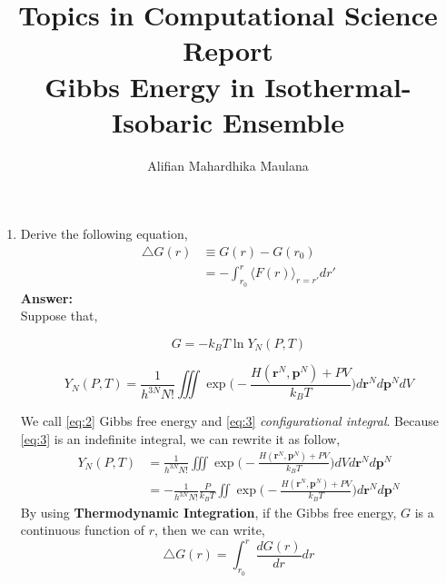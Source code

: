 \documentclass[a4paper,9pt]{article}
\title{Topics in Computational Science Report \\ Gibbs Energy in Isothermal-Isobaric Ensemble}
\author{Alifian Mahardhika Maulana}
\begin{document}
\maketitle
\begin{enumerate}
	\item Derive the following equation,
		\begin{equation}\label{eq:1}
		\begin{aligned}
		\triangle G(r) &\equiv G(r) - G(r_0)\\
		& = -\int_{r_0}^{r} \langle F(r) \rangle_{r=r'} dr'
		\end{aligned}
		\end{equation}
		\textbf{Answer:}\\
		\newline
		Suppose that,
		\begin{center}
			\begin{minipage}{0.29\linewidth}
				\begin{equation}\label{eq:2}
				G = -k_B T \ln Y_N(P,T)
				\end{equation}
			\end{minipage}
		\quad
			\begin{minipage}{0.67\linewidth}
				\begin{equation}\label{eq:3}
				Y_N(P,T) = \frac{1}{h^{3N}N!} \iiint\exp\Bigg(-\frac{H(\textbf{r}^N,\textbf{p}^N) + PV}{k_B T}\Bigg) d\textbf{r}^N d\textbf{p}^N dV
				\end{equation}
			\end{minipage}
		\end{center}
	We call \eqref{eq:2} Gibbs free energy and \eqref{eq:3} \textit{configurational integral}.
		Because \eqref{eq:3} is an indefinite integral, we can rewrite it as follow,
		\begin{equation}\label{eq:4}
		\begin{aligned}
		Y_N(P,T) &= \frac{1}{h^{3N}N!} \iiint\exp\bigg(-\frac{H(\textbf{r}^N,\textbf{p}^N) + PV}{k_B T}\bigg) dV d\textbf{r}^N d\textbf{p}^N\\
		&= -\frac{1}{h^{3N}N!}\frac{P}{k_B T} \iint\exp\bigg(-\frac{H(\textbf{r}^N,\textbf{p}^N) + PV}{k_B T}\bigg)d\textbf{r}^N d\textbf{p}^N
		\end{aligned}
		\end{equation}
		By using \textbf{Thermodynamic Integration},
		if the Gibbs free energy, $G$ is a continuous function of $r$, then we can write,
		\begin{equation}\label{eq:5}
		\triangle G(r) = \int_{r_0}^{r} \frac{d G(r)}{dr} dr

\end{equation}
\end{enumerate}
\end{document}
